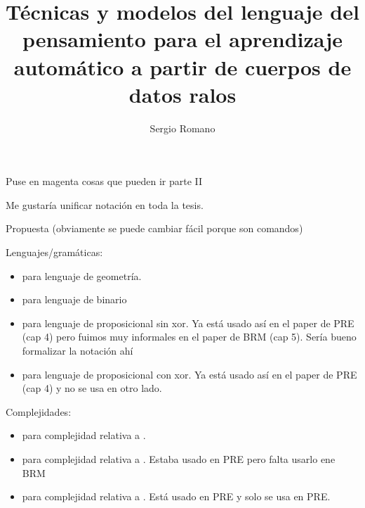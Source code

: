 \documentclass[a4paper,12pt,oneside]{book}
\title{Técnicas y modelos del lenguaje del pensamiento para el aprendizaje automático a partir de cuerpos de datos ralos}
\author{Sergio Romano}
\begin{document}
\color{magenta}
Puse en magenta cosas que pueden ir parte II

\color{black}

\bigskip

Me gustaría unificar notación en toda la tesis. 

Propuesta (obviamente se puede cambiar fácil porque son comandos)

Lenguajes/gramáticas:
\begin{itemize}
\item \gramgeo para lenguaje de geometría.
\item \grambin para lenguaje de binario

\item \grambool para lenguaje de proposicional sin xor. Ya está usado así en el paper de PRE (cap 4) pero fuimos muy informales en el paper de BRM (cap 5). Sería bueno formalizar la notación ahí

\item \gramboolxor para lenguaje de proposicional con xor. Ya está usado así en el paper de PRE (cap 4) y no se usa en otro lado.
\end{itemize}


Complejidades:

\begin{itemize}
\item \mdlbin para complejidad relativa a \grambin .

\item \mdl{\grambool} para complejidad relativa a \grambool. Estaba usado en PRE pero falta usarlo ene BRM

\item \mdl{\gramboolxor} para complejidad relativa a \gramboolxor. Está usado en PRE y solo se usa en PRE.
\end{itemize}


    
\restoregeometry 

    
    
    
    
\tableofcontents


\setlength{\parskip}{0.5em}

    
\end{document}
